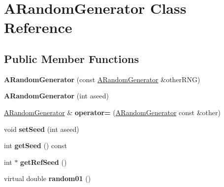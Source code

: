 \hypertarget{classARandomGenerator}{}\section{A\+Random\+Generator Class Reference}
\label{classARandomGenerator}
\subsection*{Public Member Functions}
\begin{DoxyCompactItemize}
\item 
{\bfseries A\+Random\+Generator} (const \hyperlink{classARandomGenerator}{A\+Random\+Generator} \&other\+R\+NG)\hypertarget{classARandomGenerator_aa209ff80ec6623dd434c56e163597d8c}{}\label{classARandomGenerator_aa209ff80ec6623dd434c56e163597d8c}

\item 
{\bfseries A\+Random\+Generator} (int aseed)\hypertarget{classARandomGenerator_ab8a7945444c0aab6f4c61b1afa6e96a6}{}\label{classARandomGenerator_ab8a7945444c0aab6f4c61b1afa6e96a6}

\item 
\hyperlink{classARandomGenerator}{A\+Random\+Generator} \& {\bfseries operator=} (\hyperlink{classARandomGenerator}{A\+Random\+Generator} const \&other)\hypertarget{classARandomGenerator_a004e74cdd129366e21f9c9876096fd81}{}\label{classARandomGenerator_a004e74cdd129366e21f9c9876096fd81}

\item 
void {\bfseries set\+Seed} (int aseed)\hypertarget{classARandomGenerator_a82e7f7c641f4bd4caa4e43db2f32468a}{}\label{classARandomGenerator_a82e7f7c641f4bd4caa4e43db2f32468a}

\item 
int {\bfseries get\+Seed} () const \hypertarget{classARandomGenerator_a11d8618fbf6539f2b4f0d919a5dad9a7}{}\label{classARandomGenerator_a11d8618fbf6539f2b4f0d919a5dad9a7}

\item 
int $\ast$ {\bfseries get\+Ref\+Seed} ()\hypertarget{classARandomGenerator_a7764d336630fdb25f8219d29e2d9ae80}{}\label{classARandomGenerator_a7764d336630fdb25f8219d29e2d9ae80}

\item 
virtual double {\bfseries random01} ()\hypertarget{classARandomGenerator_a7bed33db3faf4b39fa08eee18782ecb1}{}\label{classARandomGenerator_a7bed33db3faf4b39fa08eee18782ecb1}


\end{DoxyCompactItemize}
